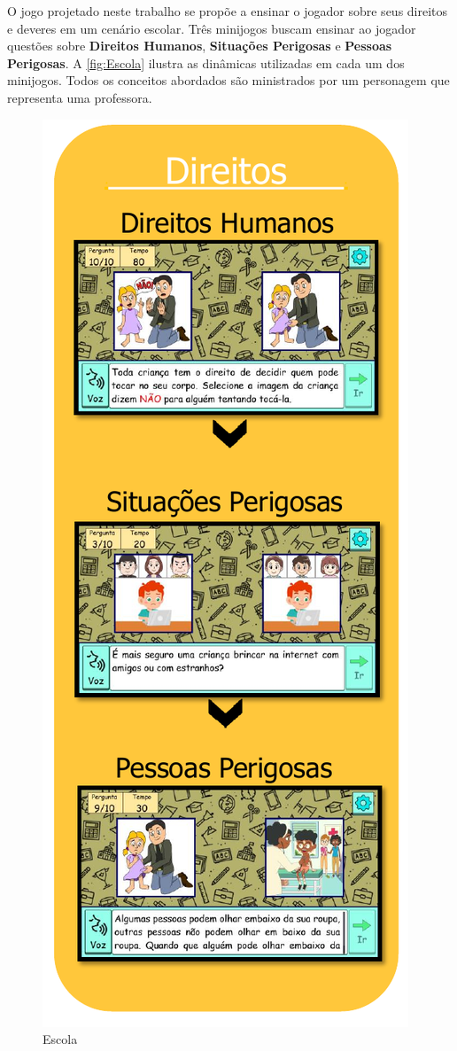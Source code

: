 O jogo projetado neste trabalho se propõe a ensinar o jogador sobre seus direitos e deveres em um cenário escolar. Três minijogos buscam ensinar ao jogador questões sobre \textbf{Direitos Humanos}, \textbf{Situações Perigosas} e \textbf{Pessoas Perigosas}. A \autoref{fig:Escola} ilustra as dinâmicas utilizadas em cada um dos minijogos. Todos os conceitos abordados são ministrados por um personagem que representa uma professora. 

\begin{figure}%
  \vspace{-20pt}
  \caption{\label{fig:Escola}Escola}
  \includegraphics[width=\linewidth]{./Visuais/Escola2.pdf}

\end{figure}
